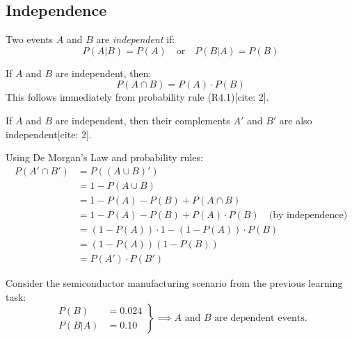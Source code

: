 \subsection*{Independence}

\begin{definition}[Independence]
    Two events $A$ and $B$ are \emph{independent} if:
    \[
        P(A|B) = P(A) \quad \text{or} \quad P(B|A) = P(B)
    \]
\end{definition}

\begin{corollary}
    If $A$ and $B$ are independent, then:
    \[
        P(A \cap B) = P(A) \cdot P(B)
    \]
    This follows immediately from probability rule (R4.1)[cite: 2].
\end{corollary}

\begin{theorem}
    If $A$ and $B$ are independent, then their complements $A'$ and $B'$ are also independent[cite: 2].
\end{theorem}

\begin{proofbox}
    Using De Morgan's Law and probability rules:
    \begin{align*}
        P(A' \cap B') &= P((A \cup B)') \\[1ex]
        &= 1 - P(A \cup B) \\[1ex]
        &= 1 - P(A) - P(B) + P(A \cap B) \\[1ex]
        &= 1 - P(A) - P(B) + P(A) \cdot P(B) \quad \text{(by independence)} \\[1ex]
        &= (1 - P(A)) \cdot 1 - (1 - P(A)) \cdot P(B) \\[1ex]
        &= (1 - P(A))(1 - P(B)) \\[1ex]
        &= P(A') \cdot P(B')
    \end{align*}
\end{proofbox}

\begin{example}
    Consider the semiconductor manufacturing scenario from the previous learning task:
    \[
        \left.
        \begin{aligned}
            P(B) &= 0.024 \\
            P(B|A) &= 0.10
        \end{aligned}
        \right\} \implies A \text{ and } B \text{ are dependent events.}
    \]
\end{example}

